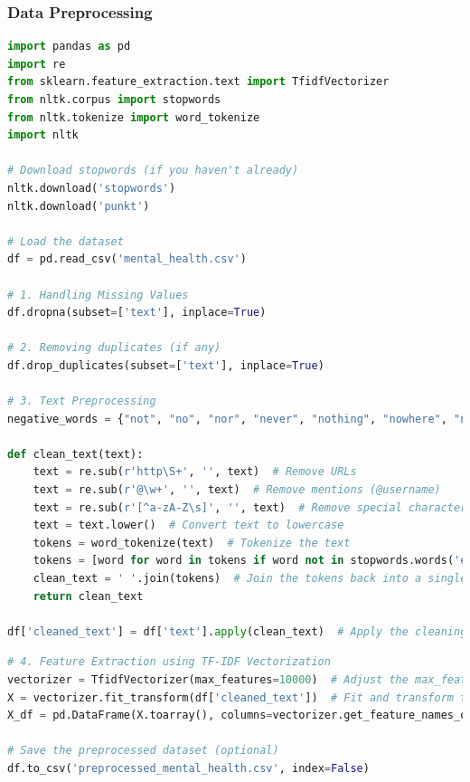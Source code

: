 \subsubsection{Data Preprocessing}

\begin{tcolorbox}[colback=gray!5!white, colframe=gray!80!black, boxrule=0.5pt, title=Text Preprocessing]
    \begin{lstlisting}[language=Python]
import pandas as pd
import re
from sklearn.feature_extraction.text import TfidfVectorizer
from nltk.corpus import stopwords
from nltk.tokenize import word_tokenize
import nltk

# Download stopwords (if you haven't already)
nltk.download('stopwords')
nltk.download('punkt')

# Load the dataset
df = pd.read_csv('mental_health.csv')

# 1. Handling Missing Values
df.dropna(subset=['text'], inplace=True)

# 2. Removing duplicates (if any)
df.drop_duplicates(subset=['text'], inplace=True)

# 3. Text Preprocessing
negative_words = {"not", "no", "nor", "never", "nothing", "nowhere", "neither", "cannot", "n't", "without", "barely", "hardly", "scarcely"}

def clean_text(text):
    text = re.sub(r'http\S+', '', text)  # Remove URLs
    text = re.sub(r'@\w+', '', text)  # Remove mentions (@username)
    text = re.sub(r'[^a-zA-Z\s]', '', text)  # Remove special characters, numbers, and punctuations
    text = text.lower()  # Convert text to lowercase
    tokens = word_tokenize(text)  # Tokenize the text
    tokens = [word for word in tokens if word not in stopwords.words('english') or word in negative_words]  # Remove stopwords, but keep negative words
    clean_text = ' '.join(tokens)  # Join the tokens back into a single string
    return clean_text

df['cleaned_text'] = df['text'].apply(clean_text)  # Apply the cleaning function to the 'text' column

\end{lstlisting}
\end{tcolorbox}

\begin{tcolorbox}[colback=gray!5!white, colframe=gray!80!black, boxrule=0.5pt, title=Text Preprocessing]
\begin{lstlisting}[language=Python]
# 4. Feature Extraction using TF-IDF Vectorization
vectorizer = TfidfVectorizer(max_features=10000)  # Adjust the max_features
X = vectorizer.fit_transform(df['cleaned_text'])  # Fit and transform the cleaned text data
X_df = pd.DataFrame(X.toarray(), columns=vectorizer.get_feature_names_out())  # Convert the result to a DataFrame for easier understanding

# Save the preprocessed dataset (optional)
df.to_csv('preprocessed_mental_health.csv', index=False)
    \end{lstlisting}
\end{tcolorbox}


